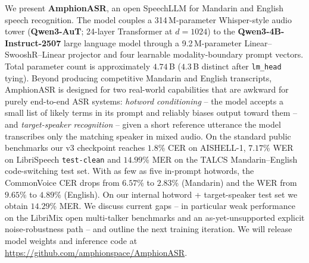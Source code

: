 We present \textbf{AmphionASR}, an open SpeechLLM for Mandarin and
English speech recognition. The model couples a 314\,M-parameter
Whisper-style audio tower (\textbf{Qwen3-AuT}; 24-layer Transformer at
$d{=}1024$) to the \textbf{Qwen3-4B-Instruct-2507} large language model
through a 9.2\,M-parameter Linear--SwooshR--Linear projector and four
learnable modality-boundary prompt vectors. Total parameter count is
approximately $4.74$\,B ($4.3$\,B distinct after \texttt{lm\_head}
tying). Beyond producing competitive Mandarin and English transcripts,
AmphionASR is designed for two real-world capabilities that are awkward
for purely end-to-end ASR systems: \emph{hotword conditioning} -- the
model accepts a small list of likely terms in its prompt and reliably
biases output toward them -- and \emph{target-speaker recognition} --
given a short reference utterance the model transcribes only the
matching speaker in mixed audio.
On the standard public benchmarks our v3 checkpoint reaches
$1.8$\% CER on AISHELL-1, $7.17$\% WER on LibriSpeech \texttt{test-clean}
and $14.99$\% MER on the TALCS Mandarin--English code-switching test
set. With as few as five in-prompt hotwords, the CommonVoice CER drops
from $6.57$\% to $2.83$\% (Mandarin) and the WER from $9.65$\% to
$4.89$\% (English). On our internal hotword + target-speaker test set
we obtain $14.29$\% MER. We discuss current gaps -- in particular weak
performance on the LibriMix open multi-talker benchmarks and an
as-yet-unsupported explicit noise-robustness path -- and outline the
next training iteration. We will release model weights and inference
code at \url{https://github.com/amphionspace/AmphionASR}.
